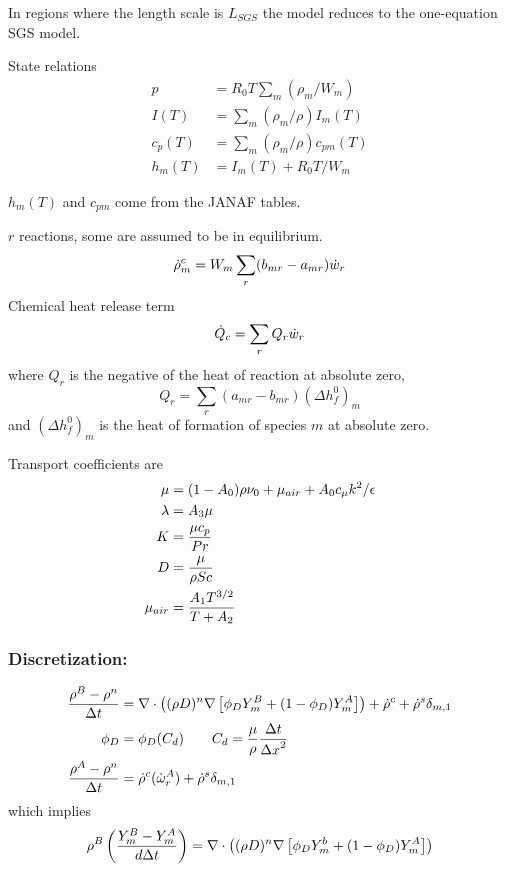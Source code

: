 \documentclass{article}
\begin{document}
In regions where the length scale is $L_{SGS}$ the model reduces to the one-equation SGS model.

State relations
\begin{align*}
   p &= R_0 T \sum_m (\rho_m/W_m) \\
  I(T) &= \sum_m (\rho_m/\rho) I_m(T) \\
  c_p(T) &= \sum_m (\rho_m/\rho) c_{pm}(T) \\
  h_m(T) &= I_m(T) + R_0 T /W_m
\end{align*}

$h_m(T)$ and $c_{pm}$ come from the JANAF tables.

$r$ reactions, some are assumed to be in equilibrium.
\[
  \dot{\rho}^c_m = W_m \sum_r  (b_{mr} - a_{mr}) \dot{w}_r 
\]
Chemical heat release term
\[
   \dot{Q}_c = \sum_r Q_r \dot{w}_r
\]
where $Q_r$ is the negative of the heat of reaction at absolute zero,
\[
 Q_r = \sum_r (a_{mr} -b_{mr}) (\Delta h_f^0)_m
\]
and $(\Delta h_f^0)_m$ is the heat of formation of species $m$ at absolute zero.

Transport coefficients are
\begin{align*}
  \mu & = (1-A_0) \rho \nu_0 + \mu_{air} + A_0 c_\mu k^2/\epsilon \\
  \lambda &= A_3 \mu \\
  K &= {\mu c_p \over Pr} \\
  D &= {\mu \over \rho Sc} \\
  \mu_{air} &= { A_1 T^{3/2} \over T+A_2}
\end{align*}


\subsubsection{Discretization:}

\begin{align}
    { \rho^B - \rho^n \over {\Delta t}} 
         & = \nabla\cdot\left(  (\rho D)^n \nabla\left[ \phi_D Y_m^B + (1-\phi_D) Y_m^A\right] \right)
              + \dot{\rho}^c + \dot{\rho}^s \delta_{m,1}  \\ 
   \phi_D &= \phi_D(C_d) \qquad C_d = {\mu\over \rho} {{\Delta t} \over {\Delta x}^2} \\
   {\rho^A-\rho^n \over {\Delta t}} &= \dot{\rho}^c( \dot{\omega}_r^A ) + \dot{\rho}^s \delta_{m,1} 
\end{align}
which implies
\[
    \rho^B \left({ Y_m^B - Y_m^A \over d{\Delta t}}\right)
         = \nabla\cdot\left(  (\rho D)^n \nabla\left[ \phi_D Y_m^b + (1-\phi_D) Y_m^A\right]\right)
\]   
\end{document}
